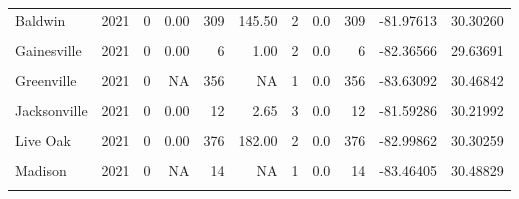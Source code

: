 \documentclass[12pt,final,CPage]{ufthesis}
\begin{document}
{\begin{table}[H]
{\begin{tabular}{lrrrrrrrrrr}
  Baldwin & 2021 & 0 & 0.00 & 309 & 145.50 & 2 & 0.0 & 309 & -81.97613 & 30.30260\\
  \cellcolor{gray!6}{Branford} & \cellcolor{gray!6}{2021} & \cellcolor{gray!6}{0} & \cellcolor{gray!6}{NA} & \cellcolor{gray!6}{12} & \cellcolor{gray!6}{NA} & \cellcolor{gray!6}{1} & \cellcolor{gray!6}{0.0} & \cellcolor{gray!6}{12} & \cellcolor{gray!6}{-82.92316} & \cellcolor{gray!6}{29.95685}\\
  Gainesville & 2021 & 0 & 0.00 & 6 & 1.00 & 2 & 0.0 & 6 & -82.36566 & 29.63691\\
  \cellcolor{gray!6}{Grand Ridge} & \cellcolor{gray!6}{2021} & \cellcolor{gray!6}{0} & \cellcolor{gray!6}{0.00} & \cellcolor{gray!6}{30} & \cellcolor{gray!6}{11.00} & \cellcolor{gray!6}{2} & \cellcolor{gray!6}{0.0} & \cellcolor{gray!6}{30} & \cellcolor{gray!6}{-85.04182} & \cellcolor{gray!6}{30.71944}\\
  \addlinespace
  Greenville & 2021 & 0 & NA & 356 & NA & 1 & 0.0 & 356 & -83.63092 & 30.46842\\
  \cellcolor{gray!6}{Greenwood} & \cellcolor{gray!6}{2021} & \cellcolor{gray!6}{0} & \cellcolor{gray!6}{NA} & \cellcolor{gray!6}{200} & \cellcolor{gray!6}{NA} & \cellcolor{gray!6}{1} & \cellcolor{gray!6}{0.0} & \cellcolor{gray!6}{200} & \cellcolor{gray!6}{-82.57149} & \cellcolor{gray!6}{28.00751}\\
  Jacksonville & 2021 & 0 & 0.00 & 12 & 2.65 & 3 & 0.0 & 12 & -81.59286 & 30.21992\\
  \cellcolor{gray!6}{Lake City} & \cellcolor{gray!6}{2021} & \cellcolor{gray!6}{49} & \cellcolor{gray!6}{9.80} & \cellcolor{gray!6}{472} & \cellcolor{gray!6}{77.72} & \cellcolor{gray!6}{5} & \cellcolor{gray!6}{9.8} & \cellcolor{gray!6}{521} & \cellcolor{gray!6}{-82.67590} & \cellcolor{gray!6}{30.12273}\\
  Live Oak & 2021 & 0 & 0.00 & 376 & 182.00 & 2 & 0.0 & 376 & -82.99862 & 30.30259\\
  \addlinespace
  \cellcolor{gray!6}{Macclenny} & \cellcolor{gray!6}{2021} & \cellcolor{gray!6}{0} & \cellcolor{gray!6}{NA} & \cellcolor{gray!6}{400} & \cellcolor{gray!6}{NA} & \cellcolor{gray!6}{1} & \cellcolor{gray!6}{0.0} & \cellcolor{gray!6}{400} & \cellcolor{gray!6}{-82.11797} & \cellcolor{gray!6}{30.28349}\\
  Madison & 2021 & 0 & NA & 14 & NA & 1 & 0.0 & 14 & -83.46405 & 30.48829\\
  \cellcolor{gray!6}{Marianna} & \cellcolor{gray!6}{2021} & \cellcolor{gray!6}{0} & \cellcolor{gray!6}{NA} & \cellcolor{gray!6}{11} & \cellcolor{gray!6}{NA} & \cellcolor{gray!6}{1} & \cellcolor{gray!6}{0.0} & \cellcolor{gray!6}{11} & \cellcolor{gray!6}{-85.20554} & \cellcolor{gray!6}{30.76829}\\

\end{tabular}}
\end{table}}
\end{document}
